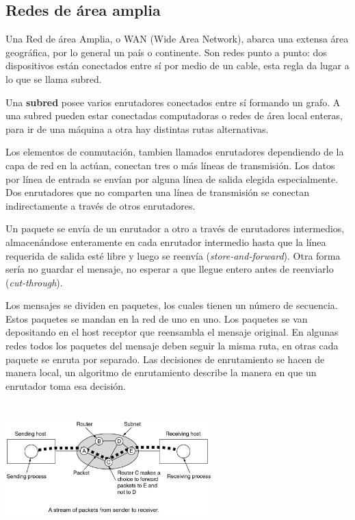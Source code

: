 \documentclass[10pt,a4paper]{report}
\begin{document}
\subsection{Redes de área amplia}
\par Una Red de área Amplia, o WAN (Wide Area Network), abarca una extensa área 
geográfica, por lo general un país o continente. Son redes punto a punto: dos 
dispositivos están conectados entre sí por medio de un cable, esta regla da lugar a lo 
que se llama subred.
\par Una \textbf{subred} posee varios enrutadores conectados entre sí formando un 
grafo. A una subred pueden estar conectadas computadoras o redes de área local 
enteras, para ir de una máquina a otra hay distintas rutas alternativas.
\par Los elementos de conmutación, tambien llamados enrutadores dependiendo de la capa de red en la actúan, conectan tres o más líneas de transmisión. Los datos por línea de entrada se envían por alguna línea de salida elegida especialmente.
Dos enrutadores que no comparten una línea de transmisión se conectan indirectamente a través de otros enrutadores.

Un paquete se envía de un enrutador a otro a través de enrutadores intermedios, almacenándose enteramente en cada enrutador intermedio hasta que la línea requerida de salida esté libre y luego se reenvía (\textit{store-and-forward}). Otra forma sería no guardar el mensaje, no esperar a que llegue entero antes de reenviarlo (\textit{cut-through}).

Los mensajes se dividen en paquetes, los cuales tienen un número de secuencia. Estos paquetes se mandan en la red de uno en uno. Los paquetes se van depositando en el host receptor que reensambla el mensaje original. En algunas redes todos los paquetes del mensaje deben seguir la misma ruta, en otras cada paquete se enruta por separado. Las decisiones de enrutamiento se hacen de manera local, un algoritmo de enrutamiento describe la manera en que un enrutador toma esa decisión.

\begin{center} 
	\includegraphics[width=8cm, height=5cm]{./imagenes/wan1.png} 
\end{center}
\end{document}
